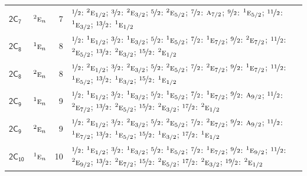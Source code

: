 \documentclass[10pt,a4paper]{article}
\numberwithin{equation}{section}
\newcommand{\grp}[1]{\mathsf{#1}}
\newcommand{\irr}[1]{\text{\normalfont\scshape #1}}
\newcommand{\conjpair}[1]{{}^{#1}}
\newlength{\fillwidth}\newlength{\cellwidth}\newlength{\colwidth}
\begin{document}
{\begin{longtable}{@{}llr>{\RaggedRight\arraybackslash}p{\fillwidth}@{}}
\href{2C7.pdf}{$\grp{2C_{7}}$} & $\conjpair{2}\irr{e}_{n}$ & 7 & $\nicefrac{1}{2}$: $\conjpair{2}\irr{e}_{1/2}$; $\nicefrac{3}{2}$: $\conjpair{2}\irr{e}_{3/2}$; $\nicefrac{5}{2}$: $\conjpair{2}\irr{e}_{5/2}$; $\nicefrac{7}{2}$: $\irr{a}_{7/2}$; $\nicefrac{9}{2}$: $\conjpair{1}\irr{e}_{5/2}$; $\nicefrac{11}{2}$: $\conjpair{1}\irr{e}_{3/2}$; $\nicefrac{13}{2}$: $\conjpair{1}\irr{e}_{1/2}$\\
\href{2C8.pdf}{$\grp{2C_{8}}$} & $\conjpair{1}\irr{e}_{n}$ & 8 & $\nicefrac{1}{2}$: $\conjpair{1}\irr{e}_{1/2}$; $\nicefrac{3}{2}$: $\conjpair{1}\irr{e}_{3/2}$; $\nicefrac{5}{2}$: $\conjpair{1}\irr{e}_{5/2}$; $\nicefrac{7}{2}$: $\conjpair{1}\irr{e}_{7/2}$; $\nicefrac{9}{2}$: $\conjpair{2}\irr{e}_{7/2}$; $\nicefrac{11}{2}$: $\conjpair{2}\irr{e}_{5/2}$; $\nicefrac{13}{2}$: $\conjpair{2}\irr{e}_{3/2}$; $\nicefrac{15}{2}$: $\conjpair{2}\irr{e}_{1/2}$\\
\href{2C8.pdf}{$\grp{2C_{8}}$} & $\conjpair{2}\irr{e}_{n}$ & 8 & $\nicefrac{1}{2}$: $\conjpair{2}\irr{e}_{1/2}$; $\nicefrac{3}{2}$: $\conjpair{2}\irr{e}_{3/2}$; $\nicefrac{5}{2}$: $\conjpair{2}\irr{e}_{5/2}$; $\nicefrac{7}{2}$: $\conjpair{2}\irr{e}_{7/2}$; $\nicefrac{9}{2}$: $\conjpair{1}\irr{e}_{7/2}$; $\nicefrac{11}{2}$: $\conjpair{1}\irr{e}_{5/2}$; $\nicefrac{13}{2}$: $\conjpair{1}\irr{e}_{3/2}$; $\nicefrac{15}{2}$: $\conjpair{1}\irr{e}_{1/2}$\\
\href{2C9.pdf}{$\grp{2C_{9}}$} & $\conjpair{1}\irr{e}_{n}$ & 9 & $\nicefrac{1}{2}$: $\conjpair{1}\irr{e}_{1/2}$; $\nicefrac{3}{2}$: $\conjpair{1}\irr{e}_{3/2}$; $\nicefrac{5}{2}$: $\conjpair{1}\irr{e}_{5/2}$; $\nicefrac{7}{2}$: $\conjpair{1}\irr{e}_{7/2}$; $\nicefrac{9}{2}$: $\irr{a}_{9/2}$; $\nicefrac{11}{2}$: $\conjpair{2}\irr{e}_{7/2}$; $\nicefrac{13}{2}$: $\conjpair{2}\irr{e}_{5/2}$; $\nicefrac{15}{2}$: $\conjpair{2}\irr{e}_{3/2}$; $\nicefrac{17}{2}$: $\conjpair{2}\irr{e}_{1/2}$\\
\href{2C9.pdf}{$\grp{2C_{9}}$} & $\conjpair{2}\irr{e}_{n}$ & 9 & $\nicefrac{1}{2}$: $\conjpair{2}\irr{e}_{1/2}$; $\nicefrac{3}{2}$: $\conjpair{2}\irr{e}_{3/2}$; $\nicefrac{5}{2}$: $\conjpair{2}\irr{e}_{5/2}$; $\nicefrac{7}{2}$: $\conjpair{2}\irr{e}_{7/2}$; $\nicefrac{9}{2}$: $\irr{a}_{9/2}$; $\nicefrac{11}{2}$: $\conjpair{1}\irr{e}_{7/2}$; $\nicefrac{13}{2}$: $\conjpair{1}\irr{e}_{5/2}$; $\nicefrac{15}{2}$: $\conjpair{1}\irr{e}_{3/2}$; $\nicefrac{17}{2}$: $\conjpair{1}\irr{e}_{1/2}$\\
\href{2C10.pdf}{$\grp{2C_{10}}$} & $\conjpair{1}\irr{e}_{n}$ & 10 & $\nicefrac{1}{2}$: $\conjpair{1}\irr{e}_{1/2}$; $\nicefrac{3}{2}$: $\conjpair{1}\irr{e}_{3/2}$; $\nicefrac{5}{2}$: $\conjpair{1}\irr{e}_{5/2}$; $\nicefrac{7}{2}$: $\conjpair{1}\irr{e}_{7/2}$; $\nicefrac{9}{2}$: $\conjpair{1}\irr{e}_{9/2}$; $\nicefrac{11}{2}$: $\conjpair{2}\irr{e}_{9/2}$; $\nicefrac{13}{2}$: $\conjpair{2}\irr{e}_{7/2}$; $\nicefrac{15}{2}$: $\conjpair{2}\irr{e}_{5/2}$; $\nicefrac{17}{2}$: $\conjpair{2}\irr{e}_{3/2}$; $\nicefrac{19}{2}$: $\conjpair{2}\irr{e}_{1/2}$\\

\end{longtable}}
\end{document}
